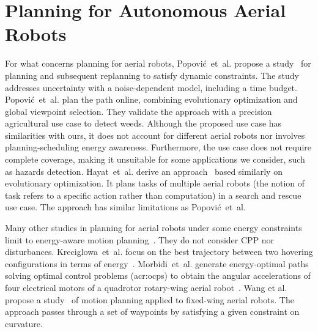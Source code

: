 \section{Planning for Autonomous Aerial Robots}
\label{sec:soa-aerial-pl}

For what concerns planning for aerial robots, Popovi\'{c}~et~al. propose a study~\citep{popovic2017online} for planning and subsequent replanning to satisfy dynamic constraints. The study addresses uncertainty with a noise-dependent model, including a time budget. Popovi\'{c}~et~al. plan the path online, combining evolutionary optimization and global viewpoint selection. They validate the approach with a precision agricultural use case to detect weeds. Although the proposed use case has similarities with ours, it does not account for different aerial robots nor involves planning-scheduling energy awareness. Furthermore, the use case does not require complete coverage, making it unsuitable for some applications we consider, such as hazards detection. Hayat~et~al. derive an approach~\citep{hayat2017multi} based similarly on evolutionary optimization. It plans tasks of multiple aerial robots (the notion of task refers to a specific action rather than computation) in a search and rescue use case. The approach has similar limitations as Popovi\'{c}~et~al.

Many other studies in planning for aerial robots under some energy constraints limit to energy-aware motion planning~\citep{wang2017curvature,morbidi2016minimum,kreciglowa2017energy}. They do not consider CPP nor disturbances. Kreciglowa~et~al. focus on the best trajectory between two hovering configurations in terms of energy~\citep{kreciglowa2017energy}. Morbidi~et~al. generate energy-optimal paths solving optimal control problems (\Gls{acr:ocp}s) to obtain the angular accelerations of four electrical motors of a quadrotor rotary-wing aerial robot~\citep{morbidi2016minimum}. 
Wang et al. propose a study~\citep{wang2017curvature} of motion planning applied to fixed-wing aerial robots. The approach passes through a set of waypoints by satisfying a given constraint on curvature.

